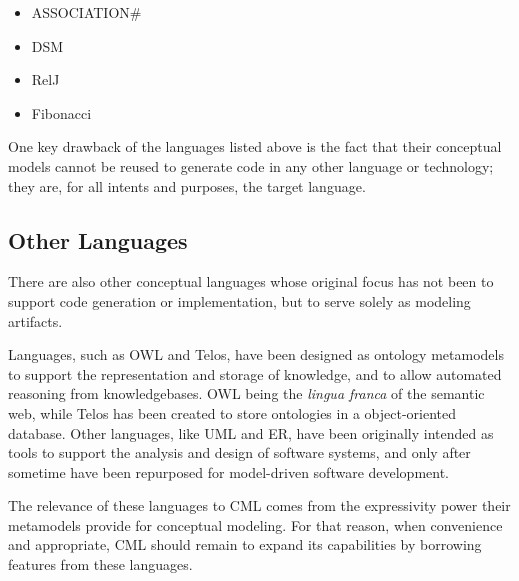 \begin{itemize}
\item ASSOCIATION\# \cite{cardoso}
\item DSM \cite{balzer}
\item RelJ \cite{bierman}
\item Fibonacci \cite{fibonacci}
\end{itemize}

One key drawback of the languages listed above is the fact that their conceptual models
cannot be reused to generate code in any other language or technology;
they are, for all intents and purposes, the target language.

\subsection{Other Languages}

There are also other conceptual languages whose original focus has not been to support code generation or implementation,
but to serve solely as modeling artifacts.

Languages, such as OWL and Telos, have been designed as ontology metamodels
to support the representation and storage of knowledge,
and to allow automated reasoning from knowledgebases.
OWL being the \emph{lingua franca} of the semantic web,
while Telos has been created to store ontologies in a object-oriented database.
Other languages, like UML and ER, have been originally intended as tools to support the analysis and design of software systems, and only after sometime have been repurposed for model-driven software development.

The relevance of these languages to CML comes from the expressivity power their metamodels provide for conceptual modeling. For that reason, when convenience and appropriate, CML should remain to expand its capabilities by borrowing features from these languages.
